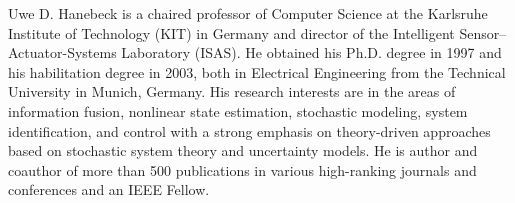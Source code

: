 \documentclass[10pt,letterpaper,oneside,twocolumn,journal]{IEEEtran}
\theoremstyle{definition}
\theoremstyle{definition}
\theoremstyle{remark}
\begin{document}
\vspace{-1\baselineskip}
\begin{IEEEbiography}{Uwe D. Hanebeck}
is a chaired professor of Computer Science at the Karlsruhe Institute of Technology (KIT) in Germany and director of the Intelligent Sensor–Actuator-Systems Laboratory (ISAS). He obtained his Ph.D. degree in 1997 and his habilitation degree in 2003, both in Electrical Engineering from the Technical University in Munich, Germany. His research interests are in the areas of information fusion, nonlinear state estimation, stochastic modeling, system identification, and control with a strong emphasis on theory-driven approaches based on stochastic system theory and uncertainty models. He is author and coauthor of more than 500 publications in various high-ranking journals and conferences and an IEEE Fellow.
\end{IEEEbiography}




\end{document}
